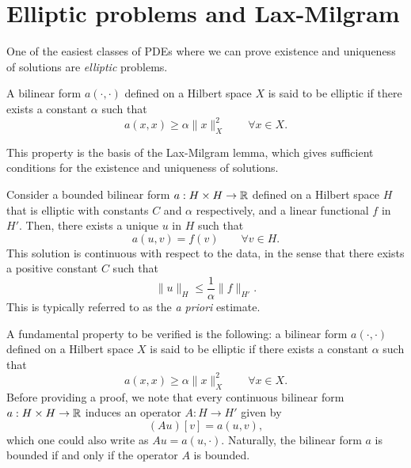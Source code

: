 \section{Elliptic problems and Lax-Milgram}
One of the easiest classes of PDEs where we can prove existence and uniqueness of solutions are \textit{elliptic} problems. 
\begin{definition}
    A bilinear form $a(\cdot, \cdot)$ defined on a Hilbert space $X$ is said to be elliptic if there exists a constant $\alpha$ such that
        \begin{equation*}
a(x, x) \geq \alpha \| x \|^2_X \qquad \forall x\in X.
\end{equation*}
\end{definition}
This property is the basis of the Lax-Milgram lemma, which gives sufficient conditions for the existence and uniqueness of solutions. 
\begin{lemma} Consider a bounded bilinear form $a: H\times H\to \mathbb{R}$ defined on a Hilbert space $H$ that is elliptic with constants $C$ and $\alpha$ respectively, and a linear functional $f$ in $H'$. Then, there exists a unique $u$ in $H$ such that 
    \begin{equation*}
a(u, v) = f(v) \qquad \forall v \in H.
\end{equation*}
This solution is continuous with respect to the data, in the sense that there exists a positive constant $C$ such that 
    \begin{equation*}
\| u\|_H \leq \frac 1 \alpha \| f \|_{H'} .
\end{equation*}
This is typically referred to as the \emph{a priori} estimate. 
\end{lemma}


 A fundamental property to be verified is the following: a bilinear form $a(\cdot, \cdot)$ defined on a Hilbert space $X$ is said to be elliptic if there exists a constant $\alpha$ such that
        \begin{equation*}
a(x, x) \geq \alpha \| x \|^2_X \qquad \forall x\in X.
\end{equation*}
Before providing a proof, we note that every continuous bilinear form $a:H\times H\to \mathbb{R}$ induces an operator $A:H\to H'$ given by
    \begin{equation*}
(Au)[v] = a(u,v),
\end{equation*}
which one could also write as $Au = a(u, \cdot)$. Naturally, the bilinear form $a$ is bounded if and only if the operator $A$ is bounded. 


